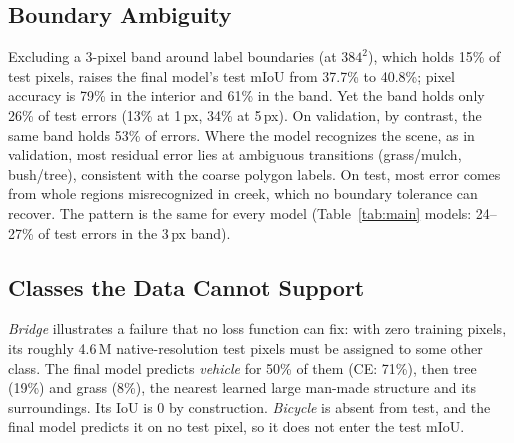 \subsection{Boundary Ambiguity}

Excluding a 3-pixel band around label boundaries (at $384^2$), which holds
15\% of test pixels, raises the final model's test mIoU from 37.7\% to 40.8\%;
pixel accuracy is 79\% in the interior and 61\% in the band. Yet the band
holds only 26\% of test errors (13\% at 1\,px, 34\% at 5\,px). On validation,
by contrast, the same band holds 53\% of errors. Where the model recognizes the
scene, as in validation, most residual error lies at ambiguous transitions
(grass/mulch, bush/tree), consistent with the coarse polygon labels. On
test, most error comes from whole regions misrecognized in creek, which no
boundary tolerance can recover. The pattern is the same for every model
(Table~\ref{tab:main} models: 24--27\% of test errors in the 3\,px band).

\subsection{Classes the Data Cannot Support}

\emph{Bridge} illustrates a failure that no loss function can fix: with zero
training pixels, its roughly 4.6\,M native-resolution test pixels must be
assigned to some other class. The final model predicts \emph{vehicle} for 50\%
of them (CE: 71\%), then tree (19\%) and grass (8\%), the nearest learned
large man-made structure and its surroundings. Its IoU is 0 by construction.
\emph{Bicycle} is absent from test, and the final model predicts it on no test
pixel, so it does not enter the test mIoU.
